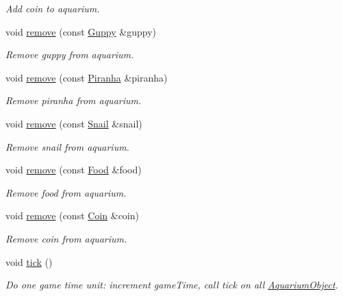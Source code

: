 \begin{DoxyCompactItemize}
\begin{DoxyCompactList}\small\item\em Add coin to aquarium. \end{DoxyCompactList}\item 
void \mbox{\hyperlink{class_aquarium_a5db51e8b6e5401fcc4140c0c26c049ef}{remove}} (const \mbox{\hyperlink{class_guppy}{Guppy}} \&guppy)
\begin{DoxyCompactList}\small\item\em Remove guppy from aquarium. \end{DoxyCompactList}\item 
void \mbox{\hyperlink{class_aquarium_a816328c7f4740a9747735d0bf0d17996}{remove}} (const \mbox{\hyperlink{class_piranha}{Piranha}} \&piranha)
\begin{DoxyCompactList}\small\item\em Remove piranha from aquarium. \end{DoxyCompactList}\item 
void \mbox{\hyperlink{class_aquarium_aaa4e4751684ac4f0ea0f818b0ac0eb9c}{remove}} (const \mbox{\hyperlink{class_snail}{Snail}} \&snail)
\begin{DoxyCompactList}\small\item\em Remove snail from aquarium. \end{DoxyCompactList}\item 
void \mbox{\hyperlink{class_aquarium_add8721889913594c0da084d780406d68}{remove}} (const \mbox{\hyperlink{class_food}{Food}} \&food)
\begin{DoxyCompactList}\small\item\em Remove food from aquarium. \end{DoxyCompactList}\item 
void \mbox{\hyperlink{class_aquarium_aa42e6fbc3cb8445f07875e5f8c127892}{remove}} (const \mbox{\hyperlink{class_coin}{Coin}} \&coin)
\begin{DoxyCompactList}\small\item\em Remove coin from aquarium. \end{DoxyCompactList}\item 
void \mbox{\hyperlink{class_aquarium_a99572f6fe551c4ae73ca5150f6e2f111}{tick}} ()
\begin{DoxyCompactList}\small\item\em Do one game time unit\+: increment game\+Time, call tick on all \mbox{\hyperlink{class_aquarium_object}{Aquarium\+Object}}. \end{DoxyCompactList}\end{DoxyCompactItemize}



